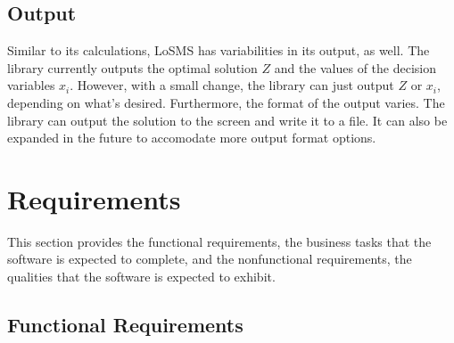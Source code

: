 \documentclass[12pt]{article}
\newcommand{\famname}{LoSMS} %
\begin{document}

\subsection{Output} \label{sec_Output}

Similar to its calculations, \famname{} has variabilities in its output, as 
well. The library currently outputs the optimal solution $Z$ and the values of 
the decision variables $x_i$. However, with a small change, the library can 
just output $Z$ or $x_i$, depending on what's desired. Furthermore, the format 
of the output varies. The library can output the solution to the screen and 
write it to a file. It can also be expanded in the future to accomodate more 
output format options.


\section{Requirements} \label{Sec_Requirements}

This section provides the functional requirements, the business tasks that the
software is expected to complete, and the nonfunctional requirements, the
qualities that the software is expected to exhibit.

\subsection{Functional Requirements}
\end{document}
